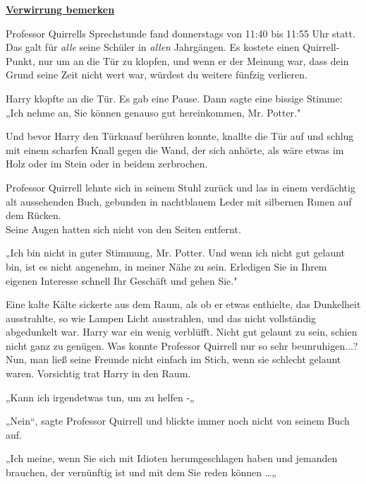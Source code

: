 

\hypertarget{verwirrung-bemerken}{%

\textbf{\uline{Verwirrung bemerken}}

Professor Quirrells Sprechstunde fand donnerstags von 11:40 bis 11:55 Uhr statt. Das galt für \emph{alle} seine Schüler in \emph{allen} Jahrgängen. Es kostete einen Quirrell-Punkt, nur um an die Tür zu klopfen, und wenn er der Meinung war, dass dein Grund seine Zeit nicht wert war, würdest du weitere fünfzig verlieren.

Harry klopfte an die Tür. Es gab eine Pause. Dann sagte eine bissige Stimme:\\ „Ich nehme an, Sie können genauso gut hereinkommen, Mr. Potter."

Und bevor Harry den Türknauf berühren konnte, knallte die Tür auf und schlug mit einem scharfen Knall gegen die Wand, der sich anhörte, als wäre etwas im Holz oder im Stein oder in beidem zerbrochen.

Professor Quirrell lehnte sich in seinem Stuhl zurück und las in einem verdächtig alt aussehenden Buch, gebunden in nachtblauem Leder mit silbernen Runen auf dem Rücken.\\ Seine Augen hatten sich nicht von den Seiten entfernt.

„Ich bin nicht in guter Stimmung, Mr. Potter. Und wenn ich nicht gut gelaunt bin, ist es nicht angenehm, in meiner Nähe zu sein. Erledigen Sie in Ihrem eigenen Interesse schnell Ihr Geschäft und gehen Sie."

Eine kalte Kälte sickerte aus dem Raum, als ob er etwas enthielte, das Dunkelheit ausstrahlte, so wie Lampen Licht ausstrahlen, und das nicht vollständig abgedunkelt war. Harry war ein wenig verblüfft. Nicht gut gelaunt zu sein, schien nicht ganz zu genügen. Was konnte Professor Quirrell nur so sehr beunruhigen...?\\ Nun, man ließ seine Freunde nicht einfach im Stich, wenn sie schlecht gelaunt waren. Vorsichtig trat Harry in den Raum.

„Kann ich irgendetwas tun, um zu helfen -„

„Nein“, sagte Professor Quirrell und blickte immer noch nicht von seinem Buch auf.

„Ich meine, wenn Sie sich mit Idioten herumgeschlagen haben und jemanden brauchen, der vernünftig ist und mit dem Sie reden können …„

}
